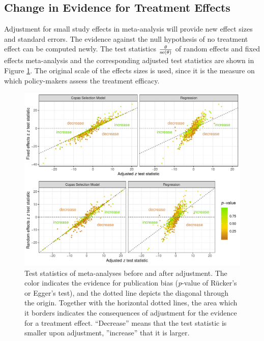 \documentclass[11pt,a4paper,twoside]{book}\usepackage[]{graphicx}\usepackage[]{color}
\newenvironment{knitrout}{}{} %
\begin{document}
\subsection{Change in Evidence for Treatment Effects} \label{sec:change.evidence}
Adjustment for small study effects in meta-analysis will provide new effect sizes and standard errors. The evidence against the null hypothesis of no treatment effect can be computed newly. The test statistics $\frac{\theta}{\operatorname{se}(\theta)}$ of random effects and fixed effects meta-analysis and the corresponding adjusted test statistics are shown in Figure \ref{fig:evidence.adjustment}. The original scale of the effects sizes is used, since it is the measure on which policy-makers assess the treatment efficacy.

\begin{figure}
\begin{knitrout}
\color{fgcolor}

{\centering \includegraphics[width=\textwidth-3cm]{figure/ch03_figunnamed-chunk-25-1} 

}



\end{knitrout}
\caption{Test statistics of meta-analyses before and after adjustment. The color indicates the evidence for publication bias (\textit{p}-value of R\"ucker's or Egger's test), and the dotted line depicts the diagonal through the origin. Together with the horizontal dotted lines, the area which it borders indicates the consequences of adjustment for the evidence for a treatment effect. ``Decrease'' means that the test statistic is smaller upon adjustment, ''increase'' that it is larger.}
\label{fig:evidence.adjustment}
\end{figure}
\end{document}
